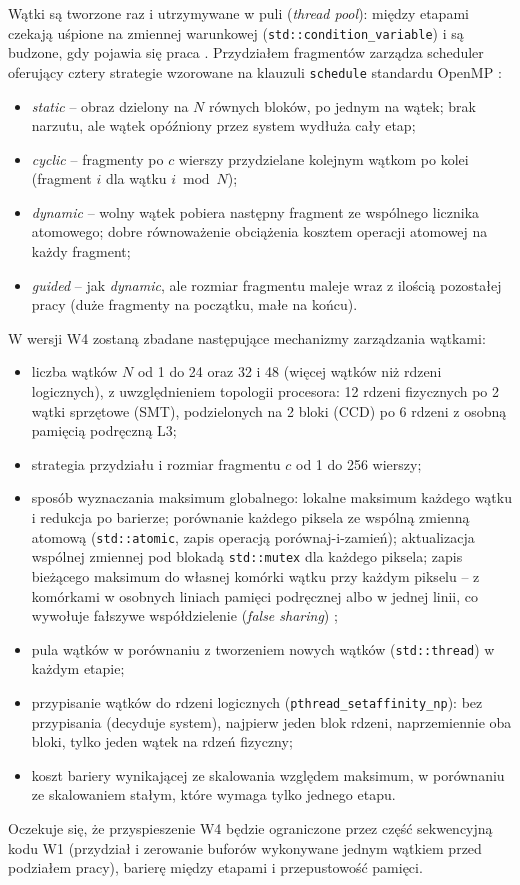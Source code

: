 \documentclass[12pt,a4paper]{article}
\newcommand{\kod}[1]{\texttt{#1}}
\begin{document}
Wątki są tworzone raz i utrzymywane w puli (\emph{thread pool}): między etapami czekają uśpione na zmiennej warunkowej (\kod{std::condition\_variable}) i są budzone, gdy pojawia się praca \cite{karbowski,williams}. Przydziałem fragmentów zarządza scheduler oferujący cztery strategie wzorowane na klauzuli \kod{schedule} standardu OpenMP \cite{openmp}:
\begin{itemize}
	\item \emph{static} -- obraz dzielony na $N$ równych bloków, po jednym na wątek; brak narzutu, ale wątek opóźniony przez system wydłuża cały etap;
	\item \emph{cyclic} -- fragmenty po $c$ wierszy przydzielane kolejnym wątkom po kolei (fragment $i$ dla wątku $i \bmod N$);
	\item \emph{dynamic} -- wolny wątek pobiera następny fragment ze wspólnego licznika atomowego; dobre równoważenie obciążenia kosztem operacji atomowej na każdy fragment;
	\item \emph{guided} -- jak \emph{dynamic}, ale rozmiar fragmentu maleje wraz z ilością pozostałej pracy (duże fragmenty na początku, małe na końcu).
\end{itemize}

W wersji W4 zostaną zbadane następujące mechanizmy zarządzania wątkami:
\begin{itemize}
	\item liczba wątków $N$ od 1 do 24 oraz 32 i 48 (więcej wątków niż rdzeni logicznych), z uwzględnieniem topologii procesora: 12 rdzeni fizycznych po 2 wątki sprzętowe (SMT), podzielonych na 2 bloki (CCD) po 6 rdzeni z osobną pamięcią podręczną L3;
	\item strategia przydziału i rozmiar fragmentu $c$ od 1 do 256 wierszy;
	\item sposób wyznaczania maksimum globalnego: lokalne maksimum każdego wątku i redukcja po barierze; porównanie każdego piksela ze wspólną zmienną atomową (\kod{std::atomic}, zapis operacją porównaj-i-zamień); aktualizacja wspólnej zmiennej pod blokadą \kod{std::mutex} dla każdego piksela; zapis bieżącego maksimum do własnej komórki wątku przy każdym pikselu -- z komórkami w osobnych liniach pamięci podręcznej albo w jednej linii, co wywołuje fałszywe współdzielenie (\emph{false sharing}) \cite{drepper};
	\item pula wątków w porównaniu z tworzeniem nowych wątków (\kod{std::thread}) w każdym etapie;
	\item przypisanie wątków do rdzeni logicznych (\kod{pthread\_setaffinity\_np}): bez przypisania (decyduje system), najpierw jeden blok rdzeni, naprzemiennie oba bloki, tylko jeden wątek na rdzeń fizyczny;
	\item koszt bariery wynikającej ze skalowania względem maksimum, w porównaniu ze skalowaniem stałym, które wymaga tylko jednego etapu.
\end{itemize}
Oczekuje się, że przyspieszenie W4 będzie ograniczone przez część sekwencyjną kodu W1 (przydział i zerowanie buforów wykonywane jednym wątkiem przed podziałem pracy), barierę między etapami i przepustowość pamięci.
\end{document}
